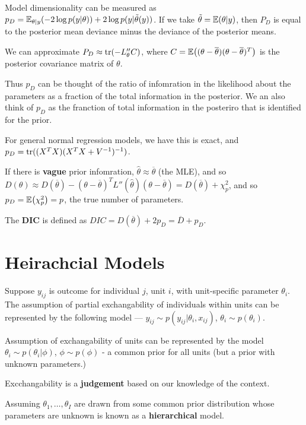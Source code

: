 \begin{defn}
  \label{sec:criticism-comparison-5}
  Model dimensionality can be measured as $p_{D} = \E_{\theta | y}(-2
  \log p(y | \theta)) + 2 \log p(y | \tilde \theta(y))$.  If we take
  $\tilde \theta = \E{\theta | y}$, then $P_{D}$ is equal to the
  posterior mean deviance minus the deviance of the posterior means.

  We can approximate $P_{D} \approx \operatorname*{tr}(-L_{\theta}'' C)$, where $C =
  \E{(\theta - \overline \theta)(\theta - \overline \theta)^{T}}$ is
  the posterior covariance matrix of $\theta$.

  Thus $p_{D}$ can be thought of the ratio of infomration in the
  likelihood about the parameters as a fraction of the total
  information in the posterior.  We an also think of $p_{D}$ as the
  franction of total information in the posteriro that is identified
  for the prior.

  For general normal regression models, we have this is exact, and
  $p_{D} = \operatorname*{tr}((X^{T} X)(X^{T}X + V^{-1})^{-1})$.

  If there is \textbf{vague} prior infomration, $\hat \theta \approx
  \overline \theta$ (the MLE), and so $D(\theta) \approx D(\overline
  \theta) - (\theta - \overline \theta)^{T} L''(\hat \theta)(\theta -
  \overline \theta) = D(\overline \theta) + \chi_{p}^{2}$, and so
  $p_{D} = \E{\chi^{2}_{p}} = p$, the true number of parameters.
\end{defn}


\begin{defn}
  \label{sec:criticism-comparison-6}
  The \textbf{DIC} is defined as $DIC = D(\overline \theta)+ 2 p_{D} =
  \overline D + p_{D}$.
\end{defn}

\section{Heirachcial Models}
\label{sec:heirachcial-models}

\begin{defn}
  \label{sec:heirachcial-models-1}
  Suppose $y_{ij}$ is outcome for individual $j$, unit $i$, with
  unit-specific parameter $\theta_{i}$.  The assumption of partial
  exchangability of individuals within units can be represented by the
  following model --- $y_{ij} \sim p(y_{ij} | \theta_{i}, x_{ij})$,
  $\theta_{i} \sim p(\theta_{i})$.

  Assumption of exchangability of units can be represented by the
  model $\theta_{i} \sim p(\theta_{i} | \phi)$, $\phi \sim p(\phi)$ -
  a common prior for all units (but a prior with unknown parameters.)

  Excchangability is a \textbf{judgement} based on our knowledge of
  the context.

  Assuming $\theta_{1}, \dots, \theta_{I}$ are drawn from some common
  prior distribution whose parameters are unknown is known as a
  \textbf{hierarchical} model.
\end{defn}


